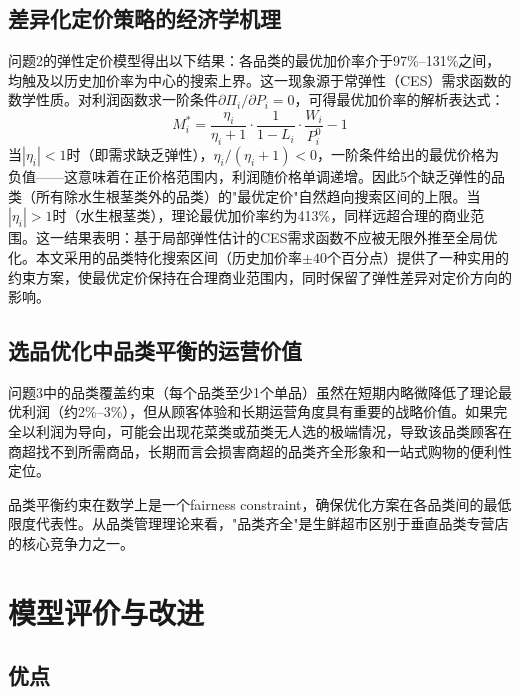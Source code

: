 \documentclass[12pt,a4paper]{ctexart}
\begin{document}
\subsection{差异化定价策略的经济学机理}

问题2的弹性定价模型得出以下结果：各品类的最优加价率介于97\%--131\%之间，均触及以历史加价率为中心的搜索上界。这一现象源于常弹性（CES）需求函数的数学性质。对利润函数求一阶条件$\partial \Pi_i / \partial P_i = 0$，可得最优加价率的解析表达式：
\begin{equation}
    M_i^* = \frac{\eta_i}{\eta_i + 1} \cdot \frac{1}{1 - L_i} \cdot \frac{W_i}{P_i^0} - 1
\end{equation}
当$|\eta_i| < 1$时（即需求缺乏弹性），$\eta_i/(\eta_i+1) < 0$，一阶条件给出的最优价格为负值——这意味着在正价格范围内，利润随价格单调递增。因此5个缺乏弹性的品类（所有除水生根茎类外的品类）的"最优定价"自然趋向搜索区间的上限。当$|\eta_i| > 1$时（水生根茎类），理论最优加价率约为413\%，同样远超合理的商业范围。这一结果表明：基于局部弹性估计的CES需求函数不应被无限外推至全局优化。本文采用的品类特化搜索区间（历史加价率$\pm 40$个百分点）提供了一种实用的约束方案，使最优定价保持在合理商业范围内，同时保留了弹性差异对定价方向的影响。

\subsection{选品优化中品类平衡的运营价值}

问题3中的品类覆盖约束（每个品类至少1个单品）虽然在短期内略微降低了理论最优利润（约2\%--3\%），但从顾客体验和长期运营角度具有重要的战略价值。如果完全以利润为导向，可能会出现花菜类或茄类无人选的极端情况，导致该品类顾客在商超找不到所需商品，长期而言会损害商超的品类齐全形象和一站式购物的便利性定位。

品类平衡约束在数学上是一个fairness constraint，确保优化方案在各品类间的最低限度代表性。从品类管理理论来看，"品类齐全"是生鲜超市区别于垂直品类专营店的核心竞争力之一。

\section{模型评价与改进}

\subsection{优点}
\end{document}
